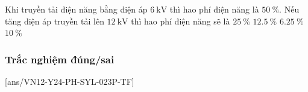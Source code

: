 \begin{ex}
	Khi truyền tải điện năng bằng điện áp $\SI{6}{\kilo\volt}$ thì hao phí điện năng là $\SI{50}{\percent}$. Nếu tăng điện áp truyền tải lên $\SI{12}{\kilo\volt}$ thì hao phí điện năng sẽ là
	\choice
	{$\SI{25}{\percent}$}
	{\True $\SI{12.5}{\percent}$}
	{$\SI{6.25}{\percent}$}
	{$\SI{10}{\percent}$}
\end{ex}
\subsubsection{Trắc nghiệm đúng/sai}
\setcounter{ex}{0}
[ans/VN12-Y24-PH-SYL-023P-TF]
